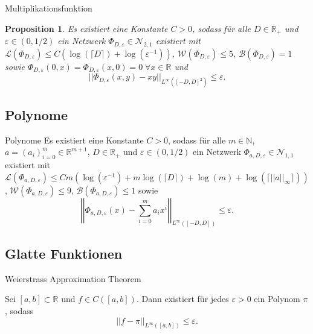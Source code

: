 \documentclass[10pt,aspectratio=169]{beamer}
\newtheorem{proposition}[theorem]{Proposition}
\newcommand{\N}{\mathbb{N}} %
\newcommand{\R}{\mathbb{R}} %
\begin{document}
\begin{frame}{Multiplikationsfunktion}
    \begin{proposition} %
        Es existiert eine Konstante \(C>0\), sodass für alle \(D\in \R_+\) und \(\varepsilon \in (0, 1/2)\) 
        ein Netzwerk \(\Phi_{D,\varepsilon} \in \mathcal{N}_{2,1}\) existiert mit 
        \(\mathcal{L}(\Phi_{D, \varepsilon}) \leq C (\log(\lceil D \rceil) + \log(\varepsilon^{-1})) \), 
        \(\mathcal{W}(\Phi_{D, \varepsilon}) \leq 5\), \(\mathcal{B}(\Phi_{D, \varepsilon}) = 1\) sowie 
        \(\Phi_{D,\varepsilon}(0,x) = \Phi_{D,\varepsilon}(x,0) = 0 \;\forall x\in \R\) und 
        \[ ||\Phi_{D,\varepsilon}(x,y) - xy||_{L^\infty([-D,D]^2)} \leq \varepsilon. \]
    \end{proposition}
\end{frame}

\subsection{Polynome}

\begin{frame}{Polynome} %
    \newcommand{\Phia}{\Phi_{a,D,\varepsilon}}
    Es existiert eine Konstante \(C>0\), sodass für alle \(m\in \N\), \(a = (a_i)_{i=0}^m \in \R^{m+1}\), 
    \(D\in \R_+\) und \(\varepsilon \in (0,1/2)\) ein Netzwerk \(\Phia \in \mathcal{N}_{1,1}\) 
    existiert mit \(\mathcal{L}(\Phia) \leq C m (\log(\varepsilon^{-1}) + m\log(\lceil D \rceil) + \log(m) + \log(\lceil ||a||_\infty \rceil))\), 
    \(\mathcal{W}(\Phia) \leq 9\), \(\mathcal{B}(\Phia) \leq 1\) sowie 
    \[ \left|\left|\Phia(x) - \sum_{i=0}^m a_i x^i \right|\right|_{L^\infty([-D,D])} \leq \varepsilon. \]
\end{frame}

\subsection{Glatte Funktionen}

\begin{frame}{Weierstrass Approximation Theorem} %
    \begin{theorem}
        Sei \([a,b] \subset \R\) und \(f\in C([a,b])\). Dann existiert für jedes \(\varepsilon > 0\) ein 
        Polynom \(\pi\), sodass 
        \[ ||f - \pi ||_{L^\infty([a,b])} \leq \varepsilon. \]
    \end{theorem}
\end{frame}
\end{document}
